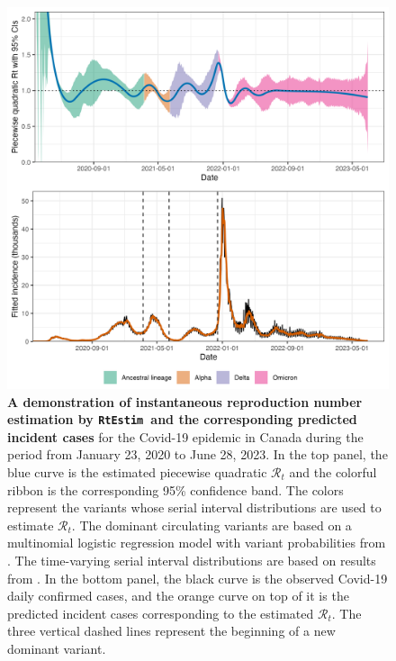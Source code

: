 \documentclass[10pt,letterpaper]{article}
\def\RtEstim{\texttt{RtEstim}}
\def\calR{\mathcal{R}}
\begin{document}
\begin{figure}[!t]
  \centering
  \includegraphics[width=1.0\textwidth]{fig/Fig1.png}
  \caption{{\bf A demonstration of instantaneous reproduction number estimation by
  \RtEstim\ and the corresponding predicted incident cases} for the Covid-19
  epidemic in Canada during the period from January 23, 2020 to June 28, 2023.
  In the top panel, the blue curve is the estimated piecewise quadratic
  $\calR_t$ and the colorful ribbon is the corresponding 95\% confidence band.
  The colors represent the variants whose serial interval distributions are used
  to estimate $\calR_t$. The dominant circulating variants are based on a
  multinomial logistic regression model with variant probabilities from
  \cite{duotang_2023}. The time-varying serial interval distributions are 
  based on results from \cite{xu2023assessing}. 
  In the bottom panel, the black curve is the observed Covid-19
  daily confirmed cases, and the orange curve on top of it is the predicted
  incident cases corresponding to the estimated $\calR_t$. The three vertical
  dashed lines represent the beginning of a new dominant variant.}
  \label{fig:intro-fig}
\end{figure}
\end{document}
